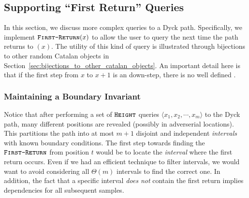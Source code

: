 \subsection{Supporting ``First Return'' Queries}%
\label{sec:supporting_first_return_queries}
In this section, we discuss more complex queries to a Dyck path.
Specifically, we implement $\texttt{\textsc{First-Return}}(x)$ to allow the user to query the next time the path returns to $(x)$.
The utility of this kind of query is illustrated through bijections to other random Catalan objects
in Section~\ref{sec:bijections_to_other_catalan_objects}.
An important detail here is that if the first step from $x$ to $x+1$ is an down-step, there is no well defined .




\subsubsection{Maintaining a Boundary Invariant}
\label{sec:maintaining_a_boundary_invariant}
Notice that after performing a set of $\texttt{\textsc{Height}}$ queries $\langle x_1, x_2,\cdots, x_m \rangle$ to the Dyck path,
many different positions are revealed (possibly in adverserial locations).
This partitions the path into at most $m+1$ disjoint and independent \emph{intervals} with known boundary conditions.
The first step towards finding the $\texttt{\textsc{First-Return}}$ from position $t$ would be to locate the \emph{interval} where the first return occurs.
Even if we had an efficient technique to filter intervals, we would want to avoid considering all $\Theta(m)$ intervals to find the correct one.
In addition, the fact that a specific interval \emph{does not} contain the first return implies dependencies for all subsequent samples.

